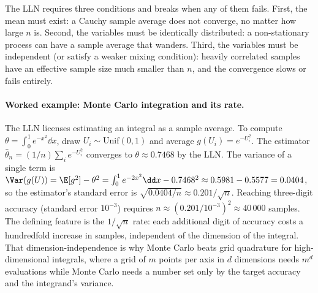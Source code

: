 The LLN requires three conditions and breaks when any of them
fails. First, the mean must exist: a Cauchy sample average does not
converge, no matter how large $n$ is. Second, the variables must be
identically distributed: a non-stationary process can have a sample
average that wanders. Third, the variables must be independent (or
satisfy a weaker mixing condition): heavily correlated samples have
an effective sample size much smaller than $n$, and the convergence
slows or fails entirely.

\paragraph{Worked example: Monte Carlo integration and its rate.}
The LLN licenses estimating an integral as a sample average. To
compute $\theta = \int_{0}^{1} e^{-x^{2}} \dd x$, draw $U_{i} \sim
\mathrm{Unif}(0, 1)$ and average $g(U_{i}) = e^{-U_{i}^{2}}$. The
estimator $\hat\theta_{n} = (1/n) \sum_{i} e^{-U_{i}^{2}}$ converges
to $\theta \approx 0.7468$ by the LLN. The variance of a single
term is $\Var(g(U)) = \E[g^{2}] - \theta^{2} = \int_{0}^{1}
e^{-2x^{2}} \dd x - 0.7468^{2} \approx 0.5981 - 0.5577 = 0.0404$,
so the estimator's standard error is $\sqrt{0.0404/n} \approx
0.201/\sqrt{n}$. Reaching three-digit accuracy (standard error
$10^{-3}$) requires $n \approx (0.201/10^{-3})^{2} \approx
40\,000$ samples. The defining feature is the $1/\sqrt{n}$ rate:
each additional digit of accuracy costs a hundredfold increase in
samples, independent of the dimension of the integral. That
dimension-independence is why Monte Carlo beats grid quadrature for
high-dimensional integrals, where a grid of $m$ points per axis in
$d$ dimensions needs $m^{d}$ evaluations while Monte Carlo needs a
number set only by the target accuracy and the integrand's
variance.

